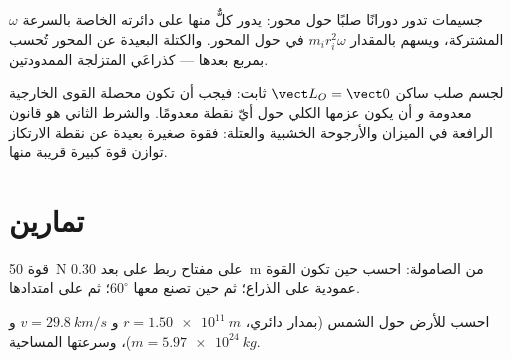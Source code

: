 \begin{omfigure}

{\small جسيمات تدور دورانًا صلبًا حول محور: يدور كلٌّ منها على
دائرته الخاصة بالسرعة $\omega$ المشتركة، ويسهم بالمقدار $m_ir_i^2\omega$ في
 حول المحور. والكتلة البعيدة عن المحور تُحسب بمربع
بعدها --- كذراعَي المتزلجة الممدودتين.}
\end{omfigure}

\begin{remark}[السكون]\label{rem:b1:angular-momentum:statics}
لجسم صلب ساكن $\vect L_O = \vect 0$ ثابت: فيجب أن تكون محصلة القوى
الخارجية معدومة \emph{و} أن يكون عزمها الكلي حول أيّ نقطة معدومًا.
والشرط الثاني هو قانون الرافعة في الميزان والأرجوحة الخشبية
والعتلة: فقوة صغيرة بعيدة عن نقطة الارتكاز توازن قوة كبيرة قريبة
منها.
\end{remark}

\section{تمارين}

\begin{exercise}[$\star$]\label{exo:b1:angular-momentum:1}
قوة \qty{50}{N} على مفتاح ربط على بعد \qty{0.30}{m} من الصامولة: احسب 
حين تكون القوة عمودية على الذراع؛ ثم حين تصنع معها $60^\circ$؛ ثم على
امتدادها.
\end{exercise}

\begin{exercise}[$\star$]\label{exo:b1:angular-momentum:2}
احسب  للأرض حول الشمس (بمدار دائري،
$r = \qty{1.50e11}{m}$ و $v = \qty{29.8}{km/s}$ و $m = \qty{5.97e24}{kg}$)،
وسرعتها المساحية.
\end{exercise}

